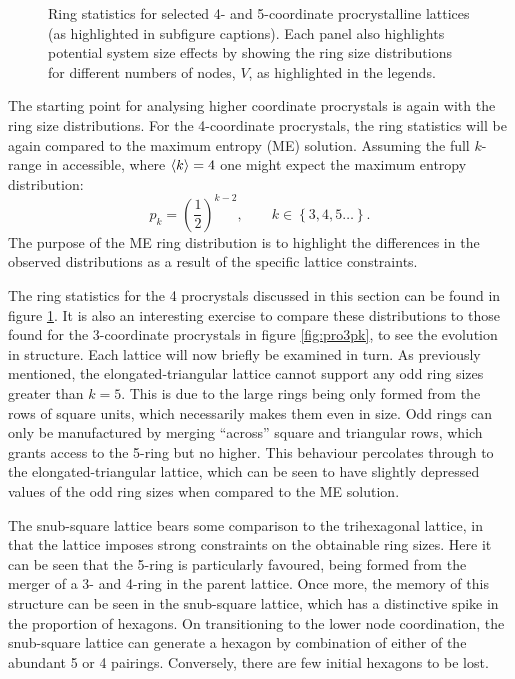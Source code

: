 \begin{figure}[bt]
     \caption{Ring statistics for selected 4\-- and 5\--coordinate procrystalline lattices (as highlighted in subfigure captions). Each panel also highlights potential system size effects by showing the ring size distributions for different numbers of nodes, $V$, as highlighted in the legends.}
     \label{fig:pro45pk}
\end{figure}

The starting point for analysing higher coordinate procrystals is again with the ring size distributions.
For the 4\--coordinate procrystals, the ring statistics will be again compared to the maximum entropy (ME) solution.
Assuming the full $k$\--range in accessible, where $\langle k \rangle=4$ one might expect the maximum entropy distribution:
\begin{equation}
	p_k = \left(\frac{1}{2}\right)^{k-2}, \qquad k\in\left\{3,4,5\dots\right\}.
\end{equation}
The purpose of the ME ring distribution is to highlight the differences in the observed distributions as a result of the specific lattice constraints.

The ring statistics for the 4 procrystals discussed in this section can be found in figure \ref{fig:pro45pk}.
It is also an interesting exercise to compare these distributions to those found for the 3\--coordinate procrystals in figure \ref{fig:pro3pk}, to see the evolution in structure.
Each lattice will now briefly be examined in turn.
As previously mentioned, the elongated\--triangular lattice cannot support any odd ring sizes greater than $k=5$. 
This is due to the large rings being only formed from the rows of square units, which necessarily makes them even in size.
Odd rings can only be manufactured by merging ``across'' square and triangular rows, which grants access to the 5\--ring but no higher.
This behaviour percolates through to the elongated\--triangular lattice, which can be seen to have slightly depressed values of the odd ring sizes when compared to the ME solution.

The snub\--square lattice bears some comparison to the trihexagonal lattice, in that the lattice imposes strong constraints on the obtainable ring sizes.
Here it can be seen that the 5\--ring is particularly favoured, being formed from the merger of a 3\-- and 4\--ring in the parent lattice.
Once more, the memory of this structure can be seen in the snub\--square lattice, which has a distinctive spike in the proportion of hexagons.
On transitioning to the lower node coordination, the snub\--square lattice can generate a hexagon by combination of either of the abundant 5 or 4 pairings.
Conversely, there are few initial hexagons to be lost.

